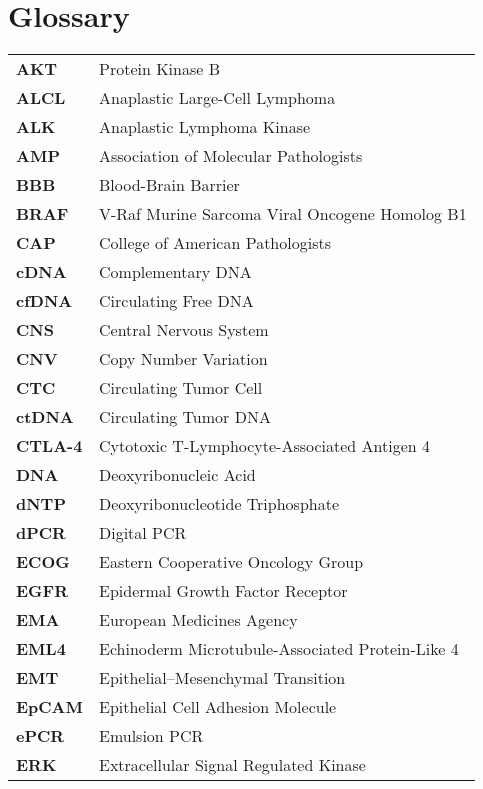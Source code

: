 \chapter*{Glossary}

\footnotesize
\begin{longtable}[l]{l l}
    \textbf{AKT} & Protein Kinase B \\ 
    \textbf{ALCL} & Anaplastic Large-Cell Lymphoma \\
    \textbf{ALK} & Anaplastic Lymphoma Kinase \\
    \textbf{AMP} & Association of Molecular Pathologists \\
    \textbf{BBB} & Blood-Brain Barrier \\
    \textbf{BRAF} & V-Raf Murine Sarcoma Viral Oncogene Homolog B1 \\
    \textbf{CAP} & College of American Pathologists \\
    \textbf{cDNA} & Complementary DNA \\
    \textbf{cfDNA} & Circulating Free DNA \\
    \textbf{CNS} & Central Nervous System \\
    \textbf{CNV} & Copy Number Variation \\
    \textbf{CTC} & Circulating Tumor Cell \\
    \textbf{ctDNA} & Circulating Tumor DNA \\
    \textbf{CTLA-4} & Cytotoxic T-Lymphocyte-Associated Antigen 4 \\
    \textbf{DNA} & Deoxyribonucleic Acid \\
    \textbf{dNTP} & Deoxyribonucleotide Triphosphate \\
    \textbf{dPCR} & Digital PCR \\
    \textbf{ECOG} & Eastern Cooperative Oncology Group \\
    \textbf{EGFR} & Epidermal Growth Factor Receptor \\
    \textbf{EMA} & European Medicines Agency \\
    \textbf{EML4} & Echinoderm Microtubule-Associated Protein-Like 4 \\
    \textbf{EMT} & Epithelial–Mesenchymal Transition \\
    \textbf{EpCAM} & Epithelial Cell Adhesion Molecule \\
    \textbf{ePCR} & Emulsion PCR \\
    \textbf{ERK} & Extracellular Signal Regulated Kinase \\

\end{longtable}
